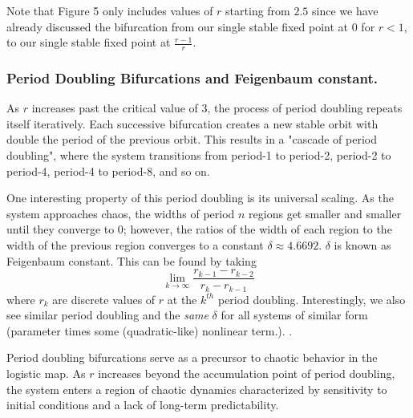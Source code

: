 \documentclass[11pt,twocolumn]{article}
\begin{document}
Note that Figure 5 only includes values of $r$ starting from $2.5$ since we have already discussed the bifurcation from our single stable fixed point at $0$ for $r<1$, to our single stable fixed point at $\frac{r-1}{r}$.
\subsubsection{Period Doubling Bifurcations and Feigenbaum constant.}
As $r$ increases past the critical value of $3$, the process of period doubling repeats itself iteratively. Each successive bifurcation creates a new stable orbit with double the period of the previous orbit. This results in a "cascade of period doubling", where the system transitions from period-1 to period-2, period-2 to period-4, period-4 to period-8, and so on.

One interesting property of this period doubling is its universal scaling.
As the system approaches chaos, the widths of period $n$ regions get smaller and smaller until they converge to 0; however, the ratios of the width of each region to the width of the previous region converges to a constant $\delta\approx 4.6692$.
$\delta$ is known as Feigenbaum constant.
This can be found by taking 
\begin{equation}
\lim_{k\to\infty}\frac{r_{k-1}-r_{k-2}}{r_k-r_{k-1}}
\end{equation}
where $r_k$ are discrete values of $r$ at the $k^{th}$ period doubling.
Interestingly, we also see similar period doubling and the \emph{same} $\delta$ for all systems of similar form (parameter times some (quadratic-like) nonlinear term.). 
\cite[p.~503]{AlligoodSauerYorke}.

Period doubling bifurcations serve as a precursor to chaotic behavior in the logistic map. As $r$ increases beyond the accumulation point of period doubling, the system enters a region of chaotic dynamics characterized by sensitivity to initial conditions and a lack of long-term predictability.
\end{document}
